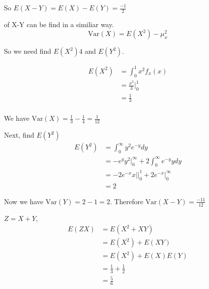 \documentclass{tufte-book}
\newcommand{\Var}{\mathrm{Var}}
\theoremstyle{mytheoremstyle}
\theoremstyle{mylemstyle}
\theoremstyle{mydefstyle}
\begin{document}
\begin{enumerate}
So $E(X-Y)=E(X)-E(Y)= \frac{-1}{2}$

 of X-Y can be find in a similiar way.
\[ \Var(X) = E(X^2) - \mu_x^2 \]

So we need find $E(X^2)4$ and $E(Y^2)$.

\begin{align*}
E(X^2) &= \int_0^1x^2f_x(x)\\
&= \frac{x^3}{3}\Big|_0^1\\
&=\frac{1}{3}\\
\end{align*}

We have $\Var(X) = \frac{1}{3} - \frac{1}{4} = \frac{1}{12}$

Next, find $E(Y^2)$
\begin{align*}
E(Y^2) &= \int_0^\infty y^2e^{-y}dy\\
&= -e^yy^2\Big|_0^\infty + 2\int_0^\infty e^{-y}ydy\\
&= -2e^{-x}x|\Big|_0^1 + 2e^{-x}\Big|_0^\infty\\
&=2
\end{align*}

Now we have $\Var(Y) = 2 - 1=2$.  Therefore $\Var(X-Y)=\frac{-11}{12}$

 $Z=X+Y$,
\begin{align*}
E(ZX)&=E(X^2+XY)\\
&= E(X^2) + E(XY)\\
&= E(X^2) + E(X)E(Y)\\
&= \frac{1}{3} + \frac{1}{2}\\
&= \frac{5}{6}
\end{align*}

\end{enumerate}
\end{document}
